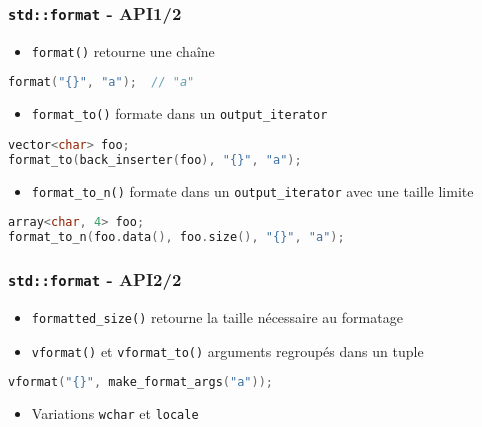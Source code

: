 \documentclass[C++.tex]{subfiles}
\begin{document}
\begin{frame}[fragile]
	\frametitle{\lstinline|std::format| - API\titlehfill{}1/2}
	\begin{itemize}
		\item \lstinline|format()| retourne une chaîne
	\end{itemize}

	\begin{lstlisting}[language=C++]
format("{}", "a"); 	// "a"\end{lstlisting}

	\begin{itemize}
		\item \lstinline|format_to()| formate dans un \lstinline|output_iterator|
	\end{itemize}

	\begin{lstlisting}[language=C++]
vector<char> foo;
format_to(back_inserter(foo), "{}", "a");\end{lstlisting}


	\begin{itemize}
		\item \lstinline|format_to_n()| formate dans un \lstinline|output_iterator| avec une taille limite
	\end{itemize}

	\begin{lstlisting}[language=C++]
array<char, 4> foo;
format_to_n(foo.data(), foo.size(), "{}", "a");\end{lstlisting}

\end{frame}

\begin{frame}[fragile]
	\frametitle{\lstinline|std::format| - API\titlehfill{}2/2}
	\begin{itemize}
		\item \lstinline|formatted_size()| retourne la taille nécessaire au formatage
		\item \lstinline|vformat()| et \lstinline|vformat_to()| arguments regroupés dans un \og tuple\fg{}
	\end{itemize}

	\begin{lstlisting}[language=C++]
vformat("{}", make_format_args("a"));\end{lstlisting}

	\begin{itemize}
		\item Variations \lstinline|wchar| et \lstinline|locale|
	\end{itemize}
\end{frame}
\end{document}
